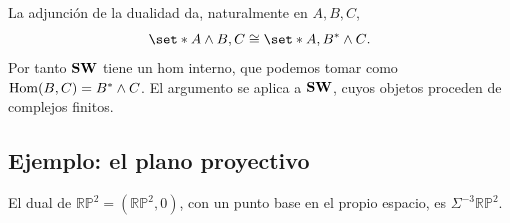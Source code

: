 \begin{nota}
La adjunción de la dualidad da, naturalmente en $A,B,C$,
\[
\set*{A\wedge B,C}\cong\set*{A,B^*\wedge C}.
\]
Por tanto $\mathbf{SW}$ tiene un hom interno, que podemos tomar como $\operatorname{Hom}(B,C)=B^*\wedge C$. El argumento se aplica a $\mathbf{SW}$, cuyos objetos proceden de complejos finitos.
\end{nota}

\subsection{Ejemplo: el plano proyectivo}

\begin{ejem}\label{ejem:rp2-dual}
El dual de $\mathbb{RP}^2=(\mathbb{RP}^2,0)$, con un punto base en el propio espacio, es $\Sigma^{-3}\mathbb{RP}^2$.
\end{ejem}

